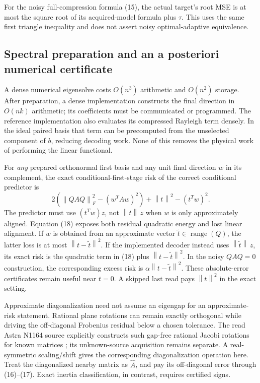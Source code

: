 \documentclass[11pt,a4paper]{article}
\newcommand{\norm}[1]{\left\lVert#1\right\rVert}
\begin{document}
For the noisy full-compression formula (15), the actual target's root MSE is at most the square root of its acquired-model formula plus $\tau$. This uses the same first triangle inequality and does not assert noisy optimal-adaptive equivalence.

\subsection{Spectral preparation and an a posteriori numerical certificate}

A dense numerical eigensolve costs $O(n^3)$ arithmetic and $O(n^2)$ storage. After preparation, a dense implementation constructs the final direction in $O(nk)$ arithmetic; its coefficients must be communicated or programmed. The reference implementation also evaluates its compressed Rayleigh term densely. In the ideal paired basis that term can be precomputed from the unselected component of $b$, reducing decoding work. None of this removes the physical work of performing the linear functional.

For \emph{any} prepared orthonormal first basis and any unit final direction $w$ in its complement, the exact conditional-first-stage risk of the correct conditional predictor is
\[
 2\left(\norm{QAQ}_F^2-(w^TAw)^2\right)
       +\norm t^2-(t^Tw)^2. \tag{18}
\]
The predictor must use $(t^Tw)z$, not $\norm t\,z$ when $w$ is only approximately aligned. Equation (18) exposes both residual quadratic energy and lost linear alignment. If $w$ is obtained from an approximate vector $\widetilde t\in\operatorname{range}(Q)$, the latter loss is at most $\norm{t-\widetilde t}^2$. If the implemented decoder instead uses $\norm{\widetilde t}\,z$, its exact risk is the quadratic term in (18) plus $\norm{t-\widetilde t}^2$. In the noisy $QAQ=0$ construction, the corresponding excess risk is $\alpha\norm{t-\widetilde t}^2$. These absolute-error certificates remain useful near $t=0$. A skipped last read pays $\norm t^2$ in the exact setting.

Approximate diagonalization need not assume an eigengap for an approximate-risk statement. Rational plane rotations can remain exactly orthogonal while driving the off-diagonal Frobenius residual below a chosen tolerance. The read Astra N1164 source explicitly constructs such gap-free rational Jacobi rotations for known matrices \cite{astra1164}; its unknown-source acquisition remains separate. A real-symmetric scaling/shift gives the corresponding diagonalization operation here. Treat the diagonalized nearby matrix as $\widehat A$, and pay its off-diagonal error through (16)--(17). Exact inertia classification, in contrast, requires certified signs.
\end{document}
